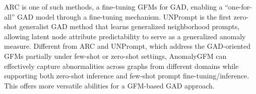 ARC \cite{liu2024arc} is one of such methods, a fine-tuning GFMs for GAD, enabling a ``one-for-all” GAD model through a fine-tuning mechanism. 
UNPrompt \cite{niu2024zero} is the first zero-shot generalist GAD method that learns generalized neighborhood prompts, allowing latent node attribute predictability to serve as a generalized anomaly measure.
Different from ARC and UNPrompt, which address the GAD-oriented GFMs partially under few-shot or zero-shot settings, AnomalyGFM can effectively capture abnormalities across graphs from different domains while supporting both zero-shot inference and few-shot prompt fine-tuning/inference. This offers more versatile abilities for a GFM-based GAD approach.